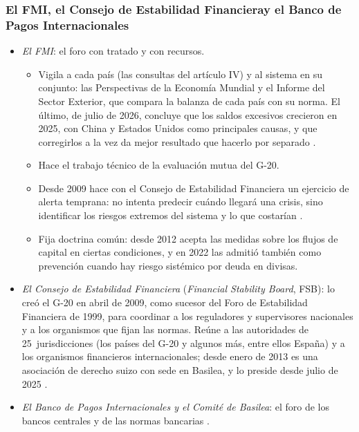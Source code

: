 \documentclass[11pt]{article}
\begin{document}
\subsubsection{El FMI, el Consejo de Estabilidad Financiera\cortetitulo y el Banco de Pagos Internacionales}\label{sec:fmi-fsb}

\begin{itemize}
\item \emph{El FMI}: el foro con tratado y con recursos.
  \begin{itemize}
  \item Vigila a cada país (las consultas del artículo IV) y al sistema en su conjunto: las Perspectivas de la Economía Mundial y el Informe del Sector Exterior, que compara la balanza de cada país con su norma. El último, de julio de 2026, concluye que los saldos excesivos crecieron en 2025, con China y Estados Unidos como principales causas, y que corregirlos a la vez da mejor resultado que hacerlo por separado\nocite{FMI2026ESR} .
  \item Hace el trabajo técnico de la evaluación mutua del G-20.
  \item Desde 2009 hace con el Consejo de Estabilidad Financiera un ejercicio de alerta temprana: no intenta predecir cuándo llegará una crisis, sino identificar los riesgos extremos del sistema y lo que costarían\nocite{FMI2010EWE} .
  \item Fija doctrina común: desde 2012 acepta las medidas sobre los flujos de capital en ciertas condiciones\nocite{FMI2012VisionInstitucional}, y en 2022 las admitió también como prevención cuando hay riesgo sistémico por deuda en divisas\nocite{FMI2022RevisionVI}.
  \end{itemize}
\item \emph{El Consejo de Estabilidad Financiera} (\emph{Financial Stability Board}, FSB): lo creó el G-20 en abril de 2009, como sucesor del Foro de Estabilidad Financiera de 1999, para coordinar a los reguladores y supervisores nacionales y a los organismos que fijan las normas. Reúne a las autoridades de 25~jurisdicciones (los países del G-20 y algunos más, entre ellos España) y a los organismos financieros internacionales; desde enero de 2013 es una asociación de derecho suizo con sede en Basilea, y lo preside  desde julio de 2025\nocite{G20Londres2009,FSB2026Historia,FSB2026Miembros,FSB2026Estructura,FSB2025Bailey} .
\item \emph{El Banco de Pagos Internacionales y el Comité de Basilea}: el foro de los bancos centrales y de las normas bancarias .
\end{itemize}
\end{document}
